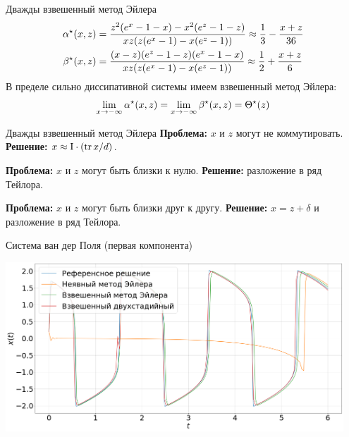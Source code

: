 \documentclass[
    14pt,
    xcolor=dvipsnames,
    aspectratio=169
]{beamer}
\begin{document}
\begin{frame}{Дважды взвешенный метод Эйлера}
    \[
        \begin{aligned}
            \alpha^\star(x,z) &= \frac{z^2 (e^x - 1 - x) - x^2 (e^z - 1 - z)}{x z( z (e^x - 1) - x (e^z - 1))} \approx \frac{1}{3} - \frac{x + z}{36} \\
            \beta^\star(x,z)  &= \frac{(x-z)(e^z - 1 - z)(e^x - 1 - x)}{x z (z(e^x - 1) - x (e^z - 1))} \approx \frac{1}{2} + \frac{x + z}{6}
        \end{aligned}
    \]
    В пределе сильно диссипативной системы имеем взвешенный метод Эйлера:
    \[
        \lim_{x \to -\infty} \alpha^\star(x,z) = \lim_{x \to -\infty} \beta^\star(x,z) = \Theta^\star(z)
    \]
\end{frame}

\begin{frame}{Дважды взвешенный метод Эйлера}
    \textbf{Проблема:} $ x $ и $ z $ могут не коммутировать.\newline
    \textbf{Решение:} $ x \approx \mathrm{I} \cdot (\operatorname*{\mathrm{tr}} x / d) $.

    \textbf{Проблема:} $ x $ и $ z $ могут быть близки к нулю.\newline
    \textbf{Решение:} разложение в ряд Тейлора.

    \textbf{Проблема:} $ x $ и $ z $ могут быть близки друг к другу.\newline
    \textbf{Решение:} $ x = z + \delta $ и разложение в ряд Тейлора.
\end{frame}

\begin{frame}{Система ван дер Поля (первая компонента)}
    \begin{center}
        \includegraphics[width=0.95\textwidth]{./images/slides/van_der_Pol_double.png}
    \end{center}
\end{frame}
\end{document}
